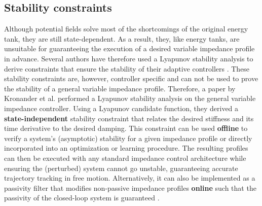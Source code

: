 \subsection{Stability constraints}

Although potential fields solve most of the shortcomings of the original energy tank, they are still state-dependent. As a result, they, like energy tanks, are unsuitable for guaranteeing the execution of a desired variable impedance profile in advance. Several authors have therefore used a Lyapunov stability analysis to derive constraints that ensure the stability of their adaptive controllers \cite{leeForceTrackingImpedance2008,linUnifiedMotionForce2021,maFractionalorderSlidingMode2019,maVariableStiffnessDamping2019,sunModelReferenceAdaptive2021,yangHumanlikeAdaptationForce2011,wahballaConstantForceTracking2022,liForceImpedanceTrajectory2018,hamedaniIntelligentImpedanceControl2021,hamedaniRecurrentFuzzyWavelet2021,ganeshVersatileBiomimeticController2012}. These stability constraints are, however, controller specific and can not be used to prove the stability of a general variable impedance profile. Therefore, a paper by Kronander et al. \cite{kronanderStabilityConsiderationsVariable2016} performed a Lyapunov stability analysis on the general variable impedance controller. Using a Lyapunov candidate function, they derived a \textbf{state-independent} stability constraint that relates the desired stiffness and its time derivative to the desired damping. This constraint can be used \textbf{offline} to verify a system's (asymptotic) stability for a given impedance profile or directly incorporated into an optimization or learning procedure. The resulting profiles can then be executed with any standard impedance control architecture while ensuring the (perturbed) system cannot go unstable, guaranteeing accurate trajectory tracking in free motion. Alternatively, it can also be implemented as a passivity filter that modifies non-passive impedance profiles \textbf{online} such that the passivity of the closed-loop system is guaranteed \cite{bednarczykPassivityFilterVariable2020}.

